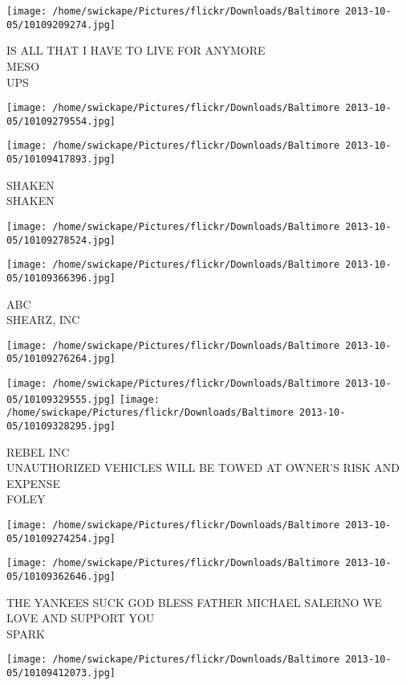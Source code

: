 \documentclass[10pt,letterpaper]{article}
\begin{document}
\texttt{[image: /home/swickape/Pictures/flickr/Downloads/Baltimore 2013-10-05/10109209274.jpg]}

IS ALL THAT I HAVE TO LIVE FOR ANYMORE\\
MESO\\
UPS
\pagebreak

\texttt{[image: /home/swickape/Pictures/flickr/Downloads/Baltimore 2013-10-05/10109279554.jpg]}

\vspace{0.25in}
\texttt{[image: /home/swickape/Pictures/flickr/Downloads/Baltimore 2013-10-05/10109417893.jpg]}

SHAKEN\\
SHAKEN
\pagebreak

\texttt{[image: /home/swickape/Pictures/flickr/Downloads/Baltimore 2013-10-05/10109278524.jpg]}

\vspace{0.25in}
\texttt{[image: /home/swickape/Pictures/flickr/Downloads/Baltimore 2013-10-05/10109366396.jpg]}

ABC\\
SHEARZ, INC
\pagebreak

\texttt{[image: /home/swickape/Pictures/flickr/Downloads/Baltimore 2013-10-05/10109276264.jpg]}

\vspace{0.25in}
\texttt{[image: /home/swickape/Pictures/flickr/Downloads/Baltimore 2013-10-05/10109329555.jpg]}
\texttt{[image: /home/swickape/Pictures/flickr/Downloads/Baltimore 2013-10-05/10109328295.jpg]}

REBEL INC\\
UNAUTHORIZED VEHICLES WILL BE TOWED AT OWNER'S RISK AND EXPENSE\\
FOLEY
\pagebreak

\texttt{[image: /home/swickape/Pictures/flickr/Downloads/Baltimore 2013-10-05/10109274254.jpg]}

\vspace{0.25in}
\texttt{[image: /home/swickape/Pictures/flickr/Downloads/Baltimore 2013-10-05/10109362646.jpg]}

THE YANKEES SUCK GOD BLESS FATHER MICHAEL SALERNO WE LOVE AND SUPPORT YOU\\
SPARK
\pagebreak

\texttt{[image: /home/swickape/Pictures/flickr/Downloads/Baltimore 2013-10-05/10109412073.jpg]}
\end{document}
